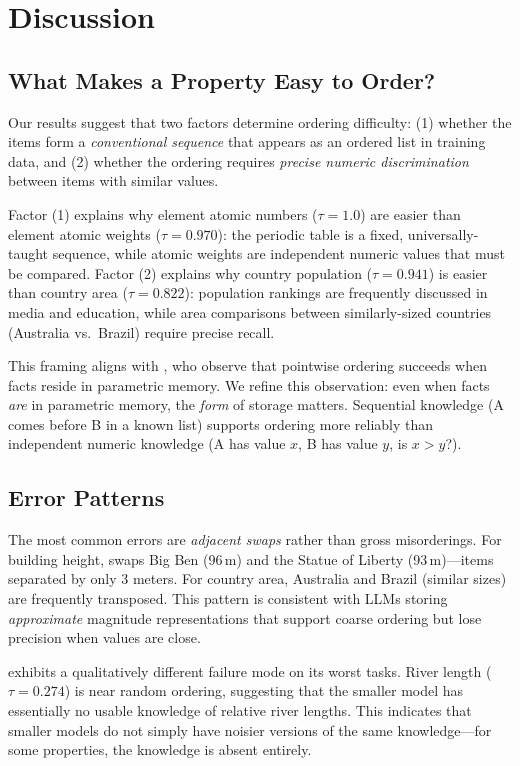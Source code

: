 \section{Discussion}
\label{sec:discussion}

\subsection{What Makes a Property Easy to Order?}

Our results suggest that two factors determine ordering difficulty: (1) whether the items form a \emph{conventional sequence} that appears as an ordered list in training data, and (2) whether the ordering requires \emph{precise numeric discrimination} between items with similar values.

Factor (1) explains why element atomic numbers ($\tau = 1.0$) are easier than element atomic weights ($\tau = 0.970$): the periodic table is a fixed, universally-taught sequence, while atomic weights are independent numeric values that must be compared.
Factor (2) explains why country population ($\tau = 0.941$) is easier than country area ($\tau = 0.822$): population rankings are frequently discussed in media and education, while area comparisons between similarly-sized countries (\eg Australia vs.\ Brazil) require precise recall.

This framing aligns with \citet{zhao2025access}, who observe that pointwise ordering succeeds when facts reside in parametric memory.
We refine this observation: even when facts \emph{are} in parametric memory, the \emph{form} of storage matters.
Sequential knowledge (A comes before B in a known list) supports ordering more reliably than independent numeric knowledge (A has value $x$, B has value $y$, is $x > y$?).

\subsection{Error Patterns}

The most common errors are \emph{adjacent swaps} rather than gross misorderings.
For building height, \gptlarge swaps Big Ben (96\,m) and the Statue of Liberty (93\,m)---items separated by only 3 meters.
For country area, Australia and Brazil (similar sizes) are frequently transposed.
This pattern is consistent with LLMs storing \emph{approximate} magnitude representations that support coarse ordering but lose precision when values are close.

\gptsmall exhibits a qualitatively different failure mode on its worst tasks.
River length ($\tau = 0.274$) is near random ordering, suggesting that the smaller model has essentially no usable knowledge of relative river lengths.
This indicates that smaller models do not simply have noisier versions of the same knowledge---for some properties, the knowledge is absent entirely.

